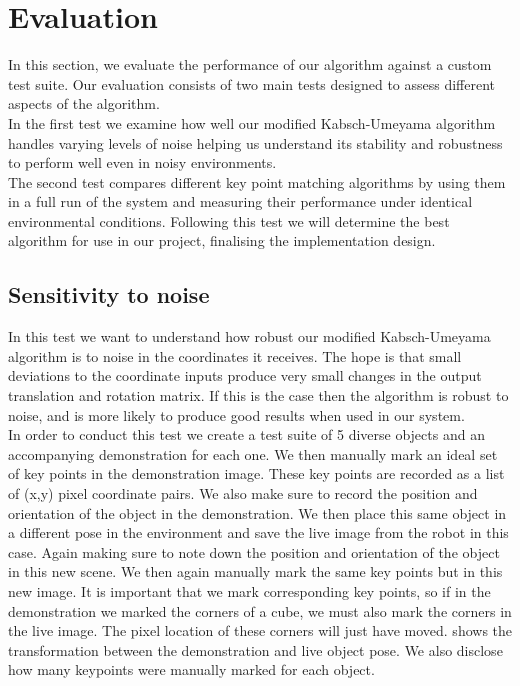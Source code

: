 \chapter{Evaluation}
\label{chap:evaluation}
In this section, we evaluate the performance of our algorithm against a custom test suite. Our evaluation consists of two main tests designed to assess different aspects of the algorithm.\\
In the first test we examine how well our modified Kabsch-Umeyama algorithm handles varying levels of noise helping us understand its stability and robustness to perform well even in noisy environments.\\
The second test compares different key point matching algorithms by using them in a full run of the system and measuring their performance under identical environmental conditions. Following this test we will determine the best algorithm for use in our project, finalising the implementation design.

\section{Sensitivity to noise}
In this test we want to understand how robust our modified Kabsch-Umeyama algorithm is to noise in the coordinates it receives. The hope is that small deviations to the coordinate inputs produce very small changes in the output translation and rotation matrix. If this is the case then the algorithm is robust to noise, and is more likely to produce good results when used in our system.\\

In order to conduct this test we create a test suite of 5 diverse objects and an accompanying demonstration for each one. We then manually mark an ideal set of key points in the demonstration image. These key points are recorded as a list of (x,y) pixel coordinate pairs. We also make sure to record the position and orientation of the object in the demonstration.
We then place this same object in a different pose in the environment and save the live image from the robot in this case. Again making sure to note down the position and orientation of the object in this new scene. We then again manually mark the same key points but in this new image. It is important that we mark corresponding key points, so if in the demonstration we marked the corners of a cube, we must also mark the corners in the live image. The pixel location of these corners will just have moved.  shows the transformation between the demonstration and live object pose. We also disclose how many keypoints were manually marked for each object.\\

